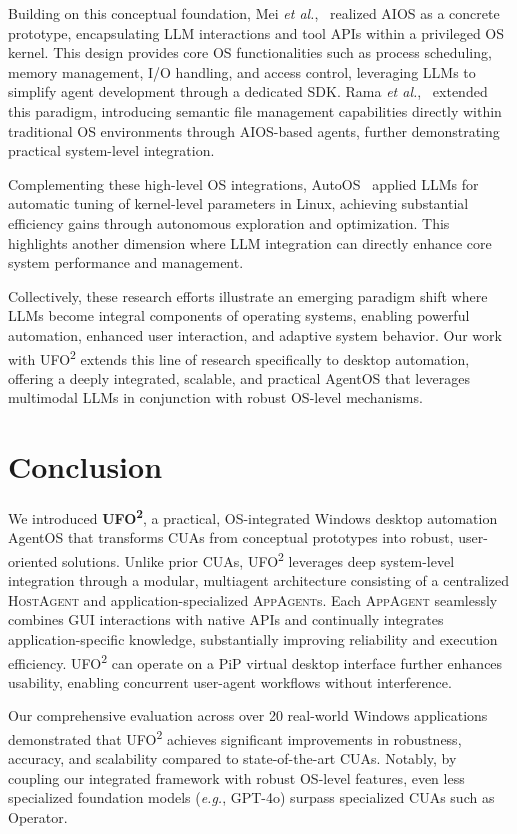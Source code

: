 \documentclass[sigplan,10pt]{acmart}
\newcommand{\name}{\textsc{UFO}\textsuperscript{2}\xspace}
\newcommand{\hosta}{\textsc{HostAgent}\xspace}
\newcommand{\appa}{\textsc{AppAgent}\xspace}
\newcommand{\appas}{\textsc{AppAgent}s\xspace}
\newcommand{\eg}{\textit{e.g.},\xspace}
\newcommand{\etal}{\textit{et al.},\xspace}
\begin{document}
Building on this conceptual foundation, Mei \etal~\cite{mei2024aios} realized AIOS as a concrete prototype, encapsulating LLM interactions and tool APIs within a privileged OS kernel. This design provides core OS functionalities such as process scheduling, memory management, I/O handling, and access control, leveraging LLMs to simplify agent development through a dedicated SDK. Rama \etal~\cite{rama2025cerebrumaiossdkplatform} extended this paradigm, introducing semantic file management capabilities directly within traditional OS environments through AIOS-based agents, further demonstrating practical system-level integration.

Complementing these high-level OS integrations, AutoOS~\cite{chen2024autoos} applied LLMs for automatic tuning of kernel-level parameters in Linux, achieving substantial efficiency gains through autonomous exploration and optimization. This highlights another dimension where LLM integration can directly enhance core system performance and management.

Collectively, these research efforts illustrate an emerging paradigm shift where LLMs become integral components of operating systems, enabling powerful automation, enhanced user interaction, and adaptive system behavior. Our work with \name extends this line of research specifically to desktop automation, offering a deeply integrated, scalable, and practical AgentOS that leverages multimodal LLMs in conjunction with robust OS-level mechanisms.

\section{Conclusion}
We introduced \textbf{\name}, a practical, OS-integrated Windows desktop automation AgentOS that transforms CUAs from conceptual prototypes into robust, user-oriented solutions. Unlike prior CUAs, \name leverages deep system-level integration through a modular, multiagent architecture consisting of a centralized \hosta and application-specialized \appas. Each \appa seamlessly combines GUI interactions with native APIs and continually integrates application-specific knowledge, substantially improving reliability and execution efficiency. \name can operate on a PiP virtual desktop interface further enhances usability, enabling concurrent user-agent workflows without interference.

Our comprehensive evaluation across over 20 real-world Windows applications demonstrated that \name achieves significant improvements in robustness, accuracy, and scalability compared to state-of-the-art CUAs. Notably, by coupling our integrated framework with robust OS-level features, even less specialized foundation models (\eg GPT-4o) surpass specialized CUAs such as Operator.
\end{document}
